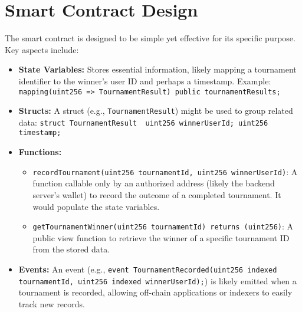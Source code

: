 \section{Smart Contract Design}
\label{sec:smart_contract}
The smart contract is designed to be simple yet effective for its specific purpose. Key aspects include:
\begin{itemize}
    \item \textbf{State Variables:} Stores essential information, likely mapping a tournament identifier to the winner's user ID and perhaps a timestamp. Example: \texttt{mapping(uint256 => TournamentResult) public tournamentResults;}
    \item \textbf{Structs:} A struct (e.g., \texttt{TournamentResult}) might be used to group related data: \texttt{struct TournamentResult { uint256 winnerUserId; uint256 timestamp; }}
    \item \textbf{Functions:}
        \begin{itemize}
            \item \texttt{recordTournament(uint256 tournamentId, uint256 winnerUserId)}: A function callable only by an authorized address (likely the backend server's wallet) to record the outcome of a completed tournament. It would populate the state variables.
            \item \texttt{getTournamentWinner(uint256 tournamentId) returns (uint256)}: A public view function to retrieve the winner of a specific tournament ID from the stored data.
        \end{itemize}
    \item \textbf{Events:} An event (e.g., \texttt{event TournamentRecorded(uint256 indexed tournamentId, uint256 indexed winnerUserId);}) is likely emitted when a tournament is recorded, allowing off-chain applications or indexers to easily track new records.
\end{itemize}

